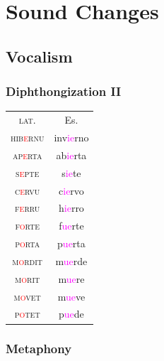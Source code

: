 \documentclass{report}[12pt]
\begin{document}
\section{Sound Changes}

\subsection{Vocalism}

\subsubsection{Diphthongization II}\label{sec:diphthongization_2}

\begin{tcolorbox}
  
\end{tcolorbox}

\begin{tabular}{c c}
  \textsc{lat.} & Es. \\
  \textsc{hib\textcolor{red}{e}rnu} & inv\textcolor{magenta}{ie}rno \\
  \textsc{ap\textcolor{red}{e}rta} & ab\textcolor{magenta}{ie}rta \\
  \textsc{s\textcolor{red}{e}pte} & s\textcolor{magenta}{ie}te \\
  \textsc{c\textcolor{red}{e}rvu} & c\textcolor{magenta}{ie}rvo \\
  \textsc{f\textcolor{red}{e}rru} & h\textcolor{magenta}{ie}rro \\
  \textsc{f\textcolor{red}{o}rte} & f\textcolor{magenta}{ue}rte \\
  \textsc{p\textcolor{red}{o}rta} & p\textcolor{magenta}{ue}rta \\
  \textsc{m\textcolor{red}{o}rdit} & m\textcolor{magenta}{ue}rde \\
  \textsc{m\textcolor{red}{o}rit} & m\textcolor{magenta}{ue}re \\
  \textsc{m\textcolor{red}{o}vet} & m\textcolor{magenta}{ue}ve \\
  \textsc{p\textcolor{red}{o}tet} & p\textcolor{magenta}{ue}de \\
\end{tabular}

\subsubsection*{Metaphony}

\begin{tcolorbox}
  
\end{tcolorbox}
\end{document}
